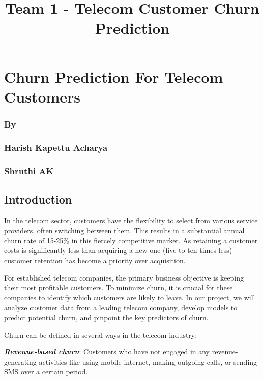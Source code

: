\documentclass[11pt]{article}
\title{Team 1 - Telecom Customer Churn Prediction}
\begin{document}
    
    \maketitle
    
    

    
    \section{Churn Prediction For Telecom
Customers}\label{churn-prediction-for-telecom-customers}

\subsubsection{By}\label{by}

\subsubsection{Harish Kapettu Acharya}\label{harish-kapettu-acharya}

\subsubsection{Shruthi AK}\label{shruthi-ak}

    \subsection{Introduction}\label{introduction}

    In the telecom sector, customers have the flexibility to select from
various service providers, often switching between them. This results in
a substantial annual churn rate of 15-25\% in this fiercely competitive
market. As retaining a customer costs is significantly less than
acquiring a new one (five to ten times less) customer retention has
become a priority over acquisition.

For established telecom companies, the primary business objective is
keeping their most profitable customers. To minimize churn, it is
crucial for these companies to identify which customers are likely to
leave. In our project, we will analyze customer data from a leading
telecom company, develop models to predict potential churn, and pinpoint
the key predictors of churn.

Churn can be defined in several ways in the telecom industry:

\textbf{\emph{Revenue-based churn}}: Customers who have not engaged in
any revenue-generating activities like using mobile internet, making
outgoing calls, or sending SMS over a certain period.
\end{document}
